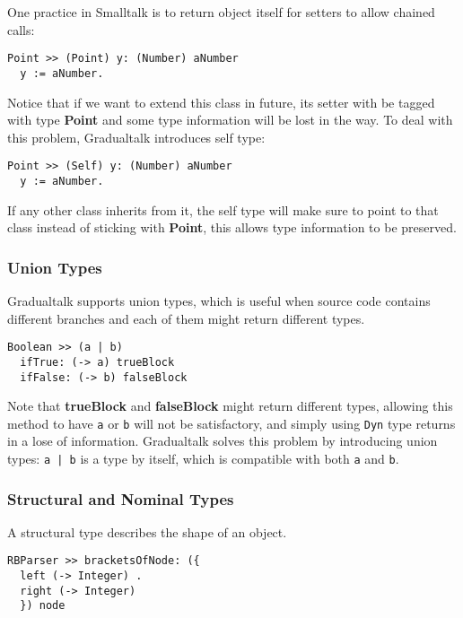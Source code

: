 One practice in Smalltalk is to return object itself for setters
to allow chained calls:

\begin{verbatim}
Point >> (Point) y: (Number) aNumber
  y := aNumber.
\end{verbatim}

Notice that if we want to extend this class in future,
its setter with be tagged with type \textbf{Point} and some
type information will be lost in the way.
To deal with this problem, Gradualtalk introduces self type:

\begin{verbatim}
Point >> (Self) y: (Number) aNumber
  y := aNumber.
\end{verbatim}

If any other class inherits from it, the self type will make sure
to point to that class instead of sticking with \textbf{Point},
this allows type information to be preserved.

\subsubsection{Union Types}

Gradualtalk supports union types, which is useful when
source code contains different branches and each of them might return different types.

\begin{verbatim}
Boolean >> (a | b)
  ifTrue: (-> a) trueBlock
  ifFalse: (-> b) falseBlock
\end{verbatim}

Note that \textbf{trueBlock} and \textbf{falseBlock} might return
different types, allowing this method to have \texttt{a} or \texttt{b}
will not be satisfactory, and simply using \texttt{Dyn} type
returns in a lose of information.
Gradualtalk solves this problem by introducing union types: \texttt{a | b}
is a type by itself, which is compatible with both \texttt{a} and \texttt{b}.

\subsubsection{Structural and Nominal Types}

A structural type describes the shape of an object.

\begin{verbatim}
RBParser >> bracketsOfNode: ({
  left (-> Integer) .
  right (-> Integer)
  }) node
\end{verbatim}

